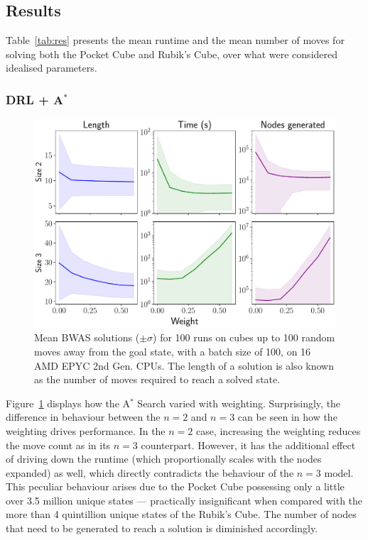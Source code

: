 \documentclass[UKenglish]{svproc}
\begin{document}
\subsection{Results}

Table~\ref{tab:res} presents the mean runtime and the mean number of moves for solving both the Pocket Cube and Rubik's Cube, over what were considered idealised parameters.


\subsubsection{DRL + A$^{\ast}$}

\begin{figure}[!ht]
  \centering
  \includegraphics[width=0.8\linewidth]{bwas}
  \caption{Mean BWAS solutions ($\pm\sigma$) for 100 runs on cubes up to 100
    random moves away from the goal state, with a batch size of 100, on 16 AMD
    EPYC 2nd Gen. CPUs. The length of a solution is also known as the number of
    moves required to reach a solved state.}
  \label{fig:bwas}
\end{figure}

Figure~\ref{fig:bwas} displays how the A$^{\ast}$ Search varied with weighting. Surprisingly, the difference in behaviour between the $n=2$ and $n=3$ can be seen in how the weighting drives performance. In the $n=2$ case, increasing the weighting reduces the move count as in its $n=3$ counterpart. However, it has the additional effect of driving down the runtime (which proportionally scales with the nodes expanded) as well, which directly contradicts the behaviour of the $n=3$ model. This peculiar behaviour arises due to the Pocket Cube possessing only a little over 3.5 million unique states --- practically insignificant when compared with the more than 4 quintillion unique states of the Rubik's Cube. The number of nodes that need to be generated to reach a solution is diminished accordingly.
\end{document}
